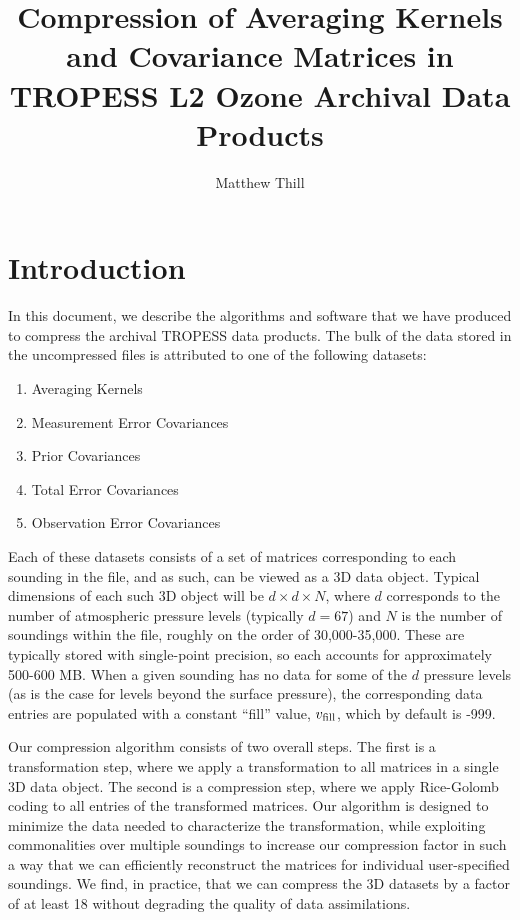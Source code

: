 \documentclass{article}
\begin{document}
\title{Compression of Averaging Kernels and Covariance Matrices in TROPESS L2 Ozone Archival Data Products}
\author{Matthew Thill} 
\maketitle

\section{Introduction} 
In this document, we describe the algorithms and software that we have produced to compress the archival TROPESS data products. The bulk of the data stored in the uncompressed files is attributed to one of the following datasets:
\begin{enumerate} 
\item Averaging Kernels 
\item Measurement Error Covariances
\item Prior Covariances
\item Total Error Covariances 
\item Observation Error Covariances 
\end{enumerate}
Each of these datasets consists of a set of matrices corresponding to each sounding in the file, and as such, can be viewed as a 3D data object. Typical dimensions of each such 3D object will be $d \times d \times N$, where $d$ corresponds to the number of atmospheric pressure levels (typically $d=67$) and $N$ is the number of soundings within the file, roughly on the order of 30,000-35,000. These are typically stored with single-point precision, so each accounts for approximately 500-600 MB. When a given sounding has no data for some of the $d$ pressure levels (as is the case for levels beyond the surface pressure), the corresponding data entries are populated with a constant ``fill'' value, $v_{\rm fill}$, which by default is -999. 

Our compression algorithm consists of two overall steps. The first is a transformation step, where we apply a transformation to all matrices in a single 3D data object. The second is a compression step, where we apply Rice-Golomb coding to all entries of the transformed matrices. Our algorithm is designed to minimize the data needed to characterize the transformation, while exploiting commonalities over multiple soundings to increase our compression factor in such a way that we can efficiently reconstruct the matrices for individual user-specified soundings. We find, in practice, that we can compress the 3D datasets by a factor of at least 18 without degrading the quality of data assimilations. 
\end{document}

